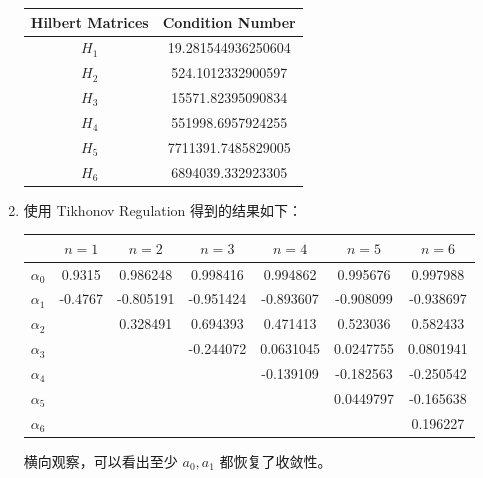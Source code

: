 \documentclass[lang=cn,a4paper,newtx,bibend=bibtex]{elegantpaper}
\begin{document}
\begin{enumerate}
\begin{table}[H]
  \centering
  \begin{tabular}{|c|c|}
  \hline
  Hilbert Matrices & Condition Number \\
  \hline
  $H_1$ & 19.281544936250604 \\
  $H_2$ & 524.1012332900597 \\
  $H_3$ & 15571.82395090834 \\
  $H_4$ & 551998.6957924255 \\
  $H_5$ & 7711391.7485829005 \\
  $H_6$ & 6894039.332923305 \\
  \hline
  \end{tabular}
  \end{table}
  \item 使用 Tikhonov Regulation 得到的结果如下：
  \begin{table}[h]
    \centering
    \begin{tabular}{|c|c|c|c|c|c|c|}
    \hline
    & $n = 1$ & $n = 2$ & $n = 3$ & $n = 4$ & $n = 5$ & $n = 6$ \\
    \hline
    $\alpha_0$ & 0.9315 & 0.986248 & 0.998416 & 0.994862 & 0.995676 & 0.997988 \\
    $\alpha_1$ & -0.4767 & -0.805191 & -0.951424 & -0.893607 & -0.908099 & -0.938697 \\
    $\alpha_2$ & & 0.328491 & 0.694393 & 0.471413 & 0.523036 & 0.582433 \\
    $\alpha_3$ & & & -0.244072 & 0.0631045 & 0.0247755 & 0.0801941 \\
    $\alpha_4$ & & & & -0.139109 & -0.182563 & -0.250542 \\
    $\alpha_5$ & & & & & 0.0449797 & -0.165638 \\
    $\alpha_6$ & & & & & & 0.196227 \\
    \hline
    \end{tabular}
    \end{table}

    横向观察，可以看出至少 $a_0, a_1$ 都恢复了收敛性。
    
\end{enumerate}
\end{document}
